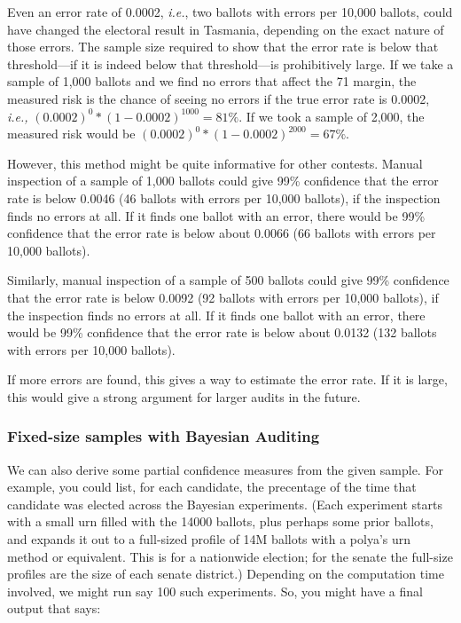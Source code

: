 \documentclass[10pt,a4paper]{article}
\begin{document}
Even an error rate of 0.0002, {\it i.e.}, two ballots with errors per 10,000 ballots, could have changed the electoral result in Tasmania, depending on the exact nature of those errors. The sample size required to show that the error rate is below that threshold---if it is indeed below that threshold---is prohibitively large. 
If we take a sample of 1,000 ballots and we find no errors that affect the 71 margin, the measured risk is the chance of seeing no errors if the true error rate is 0.0002, {\it i.e.,} $(0.0002)^0 * (1-0.0002)^{1000} = 81\%.$
If we took a sample of 2,000, the measured risk would be $(0.0002)^0 * (1-0.0002)^{2000} = 67\%.$

However, this method might be quite informative for other contests.   Manual inspection of a sample of 1,000 ballots could give 99\% confidence that the error rate is below 0.0046 (46 ballots with errors per 10,000 ballots), if the inspection finds no errors at all. If it finds one ballot with an error, there would be 99\% confidence that the error rate is below about 0.0066 (66 ballots with errors per 10,000 ballots).

Similarly, manual inspection of a sample of 500 ballots could give 99\% confidence that the error rate is below 0.0092 (92 ballots with errors per 10,000 ballots), if the inspection finds no errors at all. If it finds one ballot with an error, there would be 99\% confidence that the error rate is below about 0.0132 (132 ballots with errors per 10,000 ballots).

If more errors are found, this gives a way to estimate the error rate.  If it is large, this would give a strong argument for larger audits in the future.




\subsubsection{Fixed-size samples with Bayesian Auditing} 
We can also derive some partial confidence measures from the
given sample.  For example, you could list, for each candidate,
the precentage of the time that candidate was elected across the Bayesian
experiments.  (Each experiment starts with a small urn filled with
the 14000 ballots, plus perhaps some prior ballots, and expands
it out to a full-sized profile of 14M ballots with a polya's urn
method or equivalent.  This is for a nationwide election; for the
senate the full-size profiles are the size of each senate district.)
Depending on the computation time involved, we might run say
100 such experiments.  So, you might have a final output that says:
\end{document}
